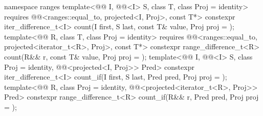 \begin{codeblock}
{  namespace ranges {
    template<@@ I, @@<I> S, class T, class Proj = identity>
      requires @@<ranges::equal_to, projected<I, Proj>, const T*>
      constexpr iter_difference_t<I>
        count(I first, S last, const T& value, Proj proj = {});
    template<@@ R, class T, class Proj = identity>
      requires @@<ranges::equal_to,
                                         projected<iterator_t<R>, Proj>, const T*>
      constexpr range_difference_t<R>
        count(R&& r, const T& value, Proj proj = {});
    template<@@ I, @@<I> S, class Proj = identity,
             @@<projected<I, Proj>> Pred>
      constexpr iter_difference_t<I>
        count_if(I first, S last, Pred pred, Proj proj = {});
    template<@@ R, class Proj = identity,
             @@<projected<iterator_t<R>, Proj>> Pred>
      constexpr range_difference_t<R>
        count_if(R&& r, Pred pred, Proj proj = {});
  }

}
\end{codeblock}
